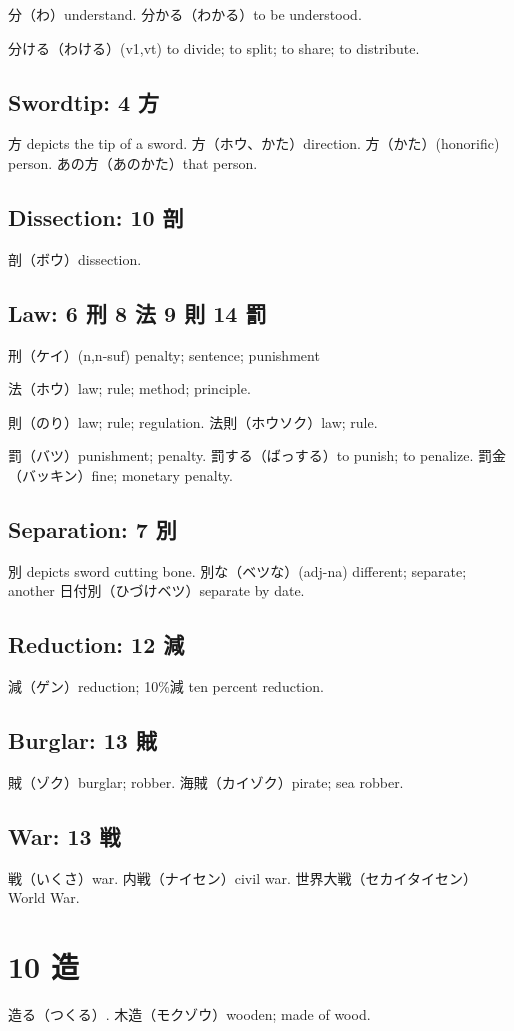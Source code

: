 分（わ）understand.
分かる（わかる）to be understood.

分ける（わける）(v1,vt) to divide; to split; to share; to distribute.

\subsection{Swordtip: 4 方}

方 depicts the tip of a sword.
方（ホウ、かた）direction.
方（かた）(honorific) person.
あの方（あのかた）that person.

\subsection{Dissection: 10 剖}

剖（ボウ）dissection.

\subsection{Law: 6 刑 8 法 9 則 14 罰}

刑（ケイ）(n,n-suf) penalty; sentence; punishment

法（ホウ）law; rule; method; principle.

則（のり）law; rule; regulation.
法則（ホウソク）law; rule.

罰（バツ）punishment; penalty.
罰する（ばっする）to punish; to penalize.
罰金（バッキン）fine; monetary penalty.

\subsection{Separation: 7 別}

別 depicts sword cutting bone.
別な（ベツな）(adj-na) different; separate; another
日付別（ひづけベツ）separate by date.

\subsection{Reduction: 12 減}

減（ゲン）reduction; 10\%減 ten percent reduction.

\subsection{Burglar: 13 賊}

賊（ゾク）burglar; robber.
海賊（カイゾク）pirate; sea robber.

\subsection{War: 13 戦}

戦（いくさ）war.
内戦（ナイセン）civil war.
世界大戦（セカイタイセン）World War.

\section{10 造}

造る（つくる）.
木造（モクゾウ）wooden; made of wood.
